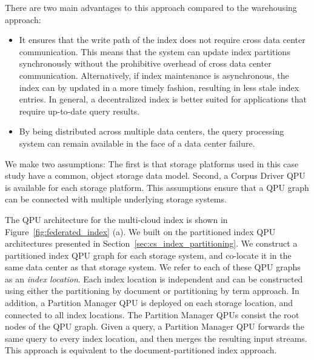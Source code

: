 There are two main advantages to this approach compared to the warehousing approach:
\begin{itemize}
  \item It ensures that the write path of the index does not require cross data center communication.
  This means that the system can update index partitions synchronously without the prohibitive overhead of
  cross data center communication.
  Alternatively, if index maintenance is asynchronous,
  the index can by updated in a more timely fashion, resulting in less stale index entries.
  In general, a decentralized index is better suited for applications that require up-to-date query results.

  \item By being distributed across multiple data centers,
  the query processing system can remain available in the face of a data center failure.
\end{itemize}

We make two assumptions:
The first is that storage platforms used in this case study have a common, object storage data model.
Second, a Corpus Driver QPU is available for each storage platform.
This assumptions ensure that a QPU graph can be connected with multiple underlying storage systems.

The QPU architecture for the multi-cloud index is shown in Figure~\ref{fig:federated_index} (a).
We built on the partitioned index QPU architectures presented in Section~\ref{sec:cs_index_partitioning}.
We construct a partitioned index QPU graph for each storage system, and co-locate it in the same data center as that
storage system.
We refer to each of these QPU graphs as an \textit{index location}.
Each index location is independent and can be constructed using either the partitioning by document or partitioning by
term approach.
In addition, a Partition Manager QPU is deployed on each storage location,
and connected to all index locations.
The Partition Manager QPUs consist the root nodes of the QPU graph.
Given a query, a Partition Manager QPU forwards the same query to every index location,
and then merges the resulting input streams.
This approach is equivalent to the document-partitioned index approach.

